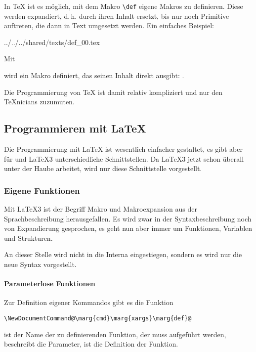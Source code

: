 In \TeX{} ist es möglich, mit dem Makro \lstinline|\def| eigene Makros
zu definieren. Diese werden expandiert, d.\,h. durch ihren Inhalt
ersetzt, bis nur noch Primitive auftreten, die dann in Text umgesetzt
werden. Ein einfaches Beispiel:
\begin{verbatimwrite}{../../../shared/texts/def_00.tex}
  \def\dreiA{AAA}
\end{verbatimwrite}
Mit

wird ein Makro definiert, das seinen Inhalt direkt ausgibt:
\dreiA.

\dreiA\hspace{\fill}\dreiA\hspace{\fill}\dreiA

Die Programmierung von \TeX{} ist damit relativ kompliziert und nur
den \TeX nicians zuzumuten.

\subsection{Programmieren mit \LaTeX}

Die Programmierung mit \LaTeX{} ist wesentlich einfacher gestaltet, es gibt
aber für \LaTeXe{} und \LaTeX3 unterschiedliche Schnittstellen. Da \LaTeX3 jetzt
schon überall unter der Haube arbeitet, wird nur diese Schnittstelle
vorgestellt.

\subsubsection{Eigene Funktionen}

Mit \LaTeX3 ist der Begriff Makro und Makroexpansion aus der Sprachbeschreibung
herausgefallen. Es wird zwar in der Syntaxbeschreibung noch von Expandierung
gesprochen, es geht nun aber immer um Funktionen, Variablen und Strukturen.

An dieser Stelle wird nicht in die Interna eingestiegen, sondern es wird
nur die neue Syntax vorgestellt.


\paragraph{Parameterlose Funktionen}

Zur Definition eigener Kommandos gibt es die Funktion
\begin{lstlisting}[escapechar=@]
\NewDocumentCommand@\marg{cmd}\marg{xargs}\marg{def}@
\end{lstlisting}
 ist der Name der zu definierenden Funktion, der \cs{} muss
aufgeführt werden, 
beschreibt die Parameter,  ist die Definition der Funktion.

